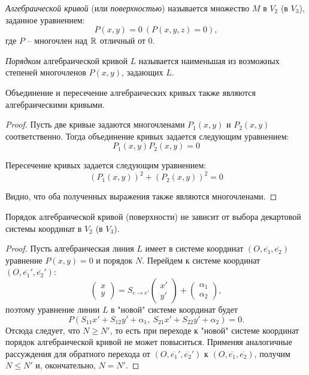     \begin{definition}
            \textit{Алгебраической кривой} (или \textit{поверхностью}) называется множество
        $M$ в $V_{2}$ (в $V_{3}$), заданное уравнением:
        \[P(x, y) = 0 \ (P(x, y, z) = 0),\]
        где $P$ -- многочлен над $\mathbb{R}$ отличный от $0$.
    \end{definition}

    \begin{definition}
            \textit{Порядком} алгебраической кривой $L$ называется наименьшая из возможных
        степеней многочленов $P(x, y)$, задающих $L$.
    \end{definition}

    \begin{proposition}
    	Объединение и пересечение алгебраических кривых также являются алгебраическими кривыми.
    \end{proposition}
    
    \begin{proof}
    	Пусть две кривые задаются многочленами $P_1(x, y)$ и $P_2(x, y)$ соответственно. Тогда объединение кривых задается следующим уравнением:
    	\[
    	P_1(x, y)P_2(x, y) = 0\]
    	
    	Пересечение кривых задается следующим уравнением:
    	\[
    	(P_1(x, y))^2 + (P_2(x, y))^2 = 0
    	\]
    	
    	Видно, что оба полученных выражения также являются многочленами.
    \end{proof}

    \begin{proposition}
            Порядок алгебраической кривой (поверхности) не зависит от выбора декартовой системы координат в $V_{2}$ (в $V_{3}$).
    \end{proposition}

    \begin{proof}
        Пусть алгебраическая линия $L$ имеет в системе координат $(O, \overline{e_{1}}, \overline{e_{2}})$ уравнение $P(x, y) = 0$ и порядок $N$. Перейдем к системе координат $(O, \overline{e_{1}}', \overline{e_{2}}')$:
        \[
            \begin{pmatrix}
    		x\\ y
            \end{pmatrix} =  S_{e \to e'} \begin{pmatrix}
    		x'\\ y'
            \end{pmatrix} + \begin{pmatrix}
    		\alpha_{1}\\ \alpha_{2}
            \end{pmatrix},
        \]
        поэтому уравнение линии $L$ в "новой" системе координат будет
        \[P(S_{11}x' + S_{12}y' + \alpha_{1}, \ S_{21}x' + S_{22}y' + \alpha_{2}) = 0.\]
        Отсюда следует, что $N \geq N'$, то есть при переходе к "новой" системе координат порядок алгебраической кривой не может повыситься. Применяя аналогичные рассуждения для обратного перехода от $(O, \overline{e_{1}}', \overline{e_{2}}')$ к $(O, \overline{e_{1}}, \overline{e_{2}})$, получим $N \leq N'$ и, окончательно, $N = N'$.
    \end{proof}